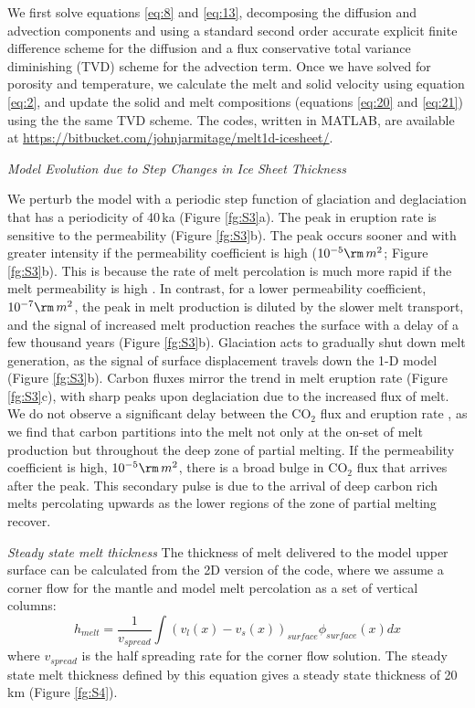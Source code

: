\documentclass[draft,grl]{agutexSI2018}
\begin{document}
\begin{article}
We first solve equations \ref{eq:8} and \ref{eq:13}, decomposing the diffusion and advection components and using a standard second order accurate explicit finite difference scheme for the diffusion and a flux conservative total variance diminishing (TVD) scheme for the advection term. Once we have solved for porosity and temperature, we calculate the melt and solid velocity using equation \ref{eq:2}, and update the solid and melt compositions (equations \ref{eq:20} and \ref{eq:21}) using the the same TVD scheme. The codes, written in MATLAB, are available at \url{https://bitbucket.com/johnjarmitage/melt1d-icesheet/}.

\noindent\textit{Model Evolution due to Step Changes in Ice Sheet Thickness}

We perturb the model with a periodic step function of glaciation and deglaciation that has a periodicity of 40\,ka (Figure \ref{fg:S3}a). The peak in eruption rate is sensitive to the permeability (Figure \ref{fg:S3}b). The peak occurs sooner and with greater intensity if the permeability coefficient is high ($10^{-5}\rm\,m^{2}$; Figure \ref{fg:S3}b). This is because the rate of melt percolation is much more rapid if the melt permeability is high \citep{burley-2015}. In contrast, for a lower permeability coefficient, $10^{-7}\rm\,m^{2}$, the peak in melt production is diluted by the slower melt transport, and the signal of increased melt production reaches the surface with a delay of a few thousand years (Figure \ref{fg:S3}b). Glaciation acts to gradually shut down melt generation, as the signal of surface displacement travels down the 1-D model (Figure \ref{fg:S3}b). Carbon fluxes mirror the trend in melt eruption rate (Figure \ref{fg:S3}c), with sharp peaks upon deglaciation due to the increased flux of melt. We do not observe a significant delay between the CO$_{2}$ flux and eruption rate \citep{burley-2015}, as we find that carbon partitions into the melt not only at the on-set of melt production but throughout the deep zone of partial melting. If the permeability coefficient is high, $10^{-5}\rm\,m^{2}$, there is a broad bulge in CO$_{2}$ flux that arrives after the peak. This secondary pulse is due to the arrival of deep carbon rich melts percolating upwards as the lower regions of the zone of partial melting recover.

\noindent\textit{Steady state melt thickness}
The thickness of melt delivered to the model upper surface can be calculated from the 2D version of the code, where we assume a corner flow for the mantle and model melt percolation as a set of vertical columns:
\begin{equation}
h_{melt} = \frac{1}{v_{spread}}\int \left(v_{l}(x) - v_{s}(x) \right)_{surface}\phi_{surface}(x) dx
\end{equation}
where $v_{spread}$ is the half spreading rate for the corner flow solution. The steady state melt thickness defined by this equation gives a steady state thickness of 20\,km (Figure \ref{fg:S4}).


\end{article}
\end{document}
